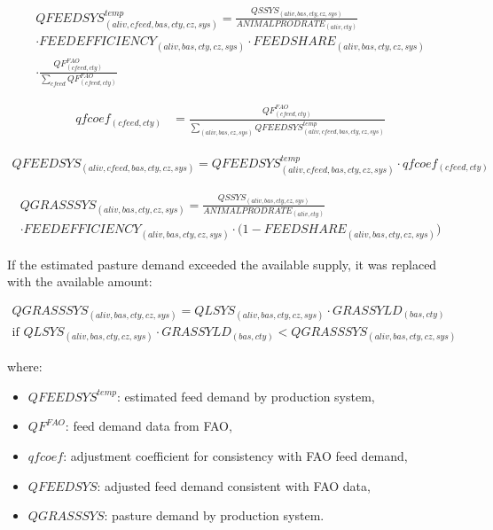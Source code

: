 \begin{multline}
QFEEDSYS^{temp}_{(aliv,cfeed,bas,cty,cz,sys)} =
\frac{QSSYS_{(aliv,bas,cty,cz,sys)}}
     {ANIMALPRODRATE_{(aliv,cty)}} \\
     \cdot
FEEDEFFICIENCY_{(aliv,bas,cty,cz,sys)} \cdot
FEEDSHARE_{(aliv,bas,cty,cz,sys)} \\
\cdot
\frac{QF^{FAO}_{(cfeed,cty)}}
     {\sum_{cfeed} QF^{FAO}_{(cfeed,cty)}}
\end{multline}

\begin{align}
qfcoef_{(cfeed,cty)} &=
\frac{QF^{FAO}_{(cfeed,cty)}}
     {\displaystyle
      \sum_{(aliv,bas,cz,sys)}
      QFEEDSYS^{temp}_{(aliv,cfeed,bas,cty,cz,sys)}}
\end{align}

\begin{multline}
QFEEDSYS_{(aliv,cfeed,bas,cty,cz,sys)} =
QFEEDSYS^{temp}_{(aliv,cfeed,bas,cty,cz,sys)} \cdot
qfcoef_{(cfeed,cty)}
\end{multline}

\begin{multline}
QGRASSSYS_{(aliv,bas,cty,cz,sys)} =
\frac{QSSYS_{(aliv,bas,cty,cz,sys)}}
     {ANIMALPRODRATE_{(aliv,cty)}} \\
     \cdot 
FEEDEFFICIENCY_{(aliv,bas,cty,cz,sys)} 
\cdot \bigl(1 - FEEDSHARE_{(aliv,bas,cty,cz,sys)}\bigr)
\end{multline}


If the estimated pasture demand exceeded the available supply, 
it was replaced with the available amount:

\begin{multline}
QGRASSSYS_{(aliv,bas,cty,cz,sys)} =
QLSYS_{(aliv,bas,cty,cz,sys)} \cdot GRASSYLD_{(bas,cty)} \\
\text{if }
QLSYS_{(aliv,bas,cty,cz,sys)} \cdot GRASSYLD_{(bas,cty)}
< QGRASSSYS_{(aliv,bas,cty,cz,sys)}
\end{multline}


where:
\begin{itemize}
\item \( QFEEDSYS^{temp} \): estimated feed demand by production system,  
\item \( QF^{FAO} \): feed demand data from FAO,  
\item \( qfcoef \): adjustment coefficient for consistency with FAO feed demand,  
\item \( QFEEDSYS \): adjusted feed demand consistent with FAO data,  
\item \( QGRASSSYS \): pasture demand by production system.
\end{itemize}


